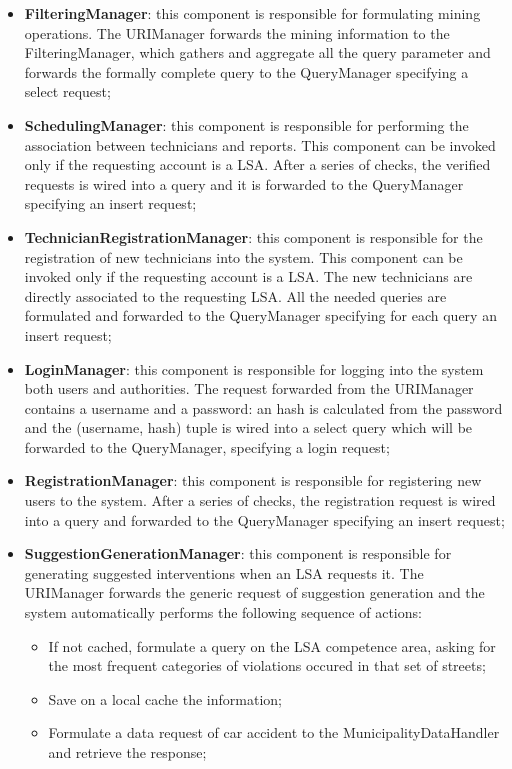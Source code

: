 \begin{itemize}
    \item \textbf{FilteringManager}: this component is responsible for formulating mining operations. The URIManager forwards the mining information to the FilteringManager, which gathers and aggregate all the query parameter and forwards the formally complete query to the QueryManager specifying a select request;
    \item \textbf{SchedulingManager}: this component is responsible for performing the association between technicians and reports. This component can be invoked only if the requesting account is a LSA. After a series of checks, the verified requests is wired into a query and it is forwarded to the QueryManager specifying an insert request;
    \item \textbf{TechnicianRegistrationManager}: this component is responsible for the registration of new technicians into the system. This component can be invoked only if the requesting account is a LSA. The new technicians are directly associated to the requesting LSA. All the needed queries are formulated and forwarded to the QueryManager specifying for each query an insert request;
    \item \textbf{LoginManager}: this component is responsible for logging into the system both users and authorities. The request forwarded from the URIManager contains a username and a password: an hash is calculated from the password and the (username, hash) tuple is wired into a select query which will be forwarded to the QueryManager, specifying a login request;
    \item \textbf{RegistrationManager}: this component is responsible for registering new users to the system. After a series of checks, the registration request is wired into a query and forwarded to the QueryManager specifying an insert request;
    \item \textbf{SuggestionGenerationManager}: this component is responsible for generating suggested interventions when an LSA requests it. The URIManager forwards the generic request of suggestion generation and the system automatically performs the following sequence of actions: 
    \begin{itemize}
        \item If not cached, formulate a query on the LSA competence area, asking for the most frequent categories of violations occured in that set of streets;
        \item Save on a local cache the information;
        \item Formulate a data request of car accident to the MunicipalityDataHandler and retrieve the response;

\end{itemize}
\end{itemize}
